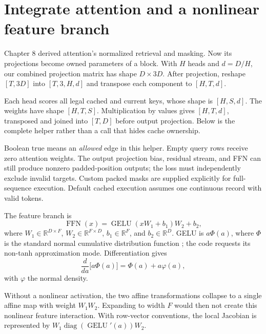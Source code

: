 
\section{Integrate attention and a nonlinear feature branch}
Chapter 8 derived attention's normalized retrieval and masking. Now its projections become owned parameters of a block. With $H$ heads and $d=D/H$, our combined projection matrix has shape $D\times3D$. After projection, reshape $[T,3D]$ into $[T,3,H,d]$ and transpose each component to $[H,T,d]$.

Each head scores all legal cached and current keys, whose shape is $[H,S,d]$. The weights have shape $[H,T,S]$. Multiplication by values gives $[H,T,d]$, transposed and joined into $[T,D]$ before output projection. Below is the complete helper rather than a call that hides cache ownership.

Boolean true means an \emph{allowed} edge in this helper. Empty query rows receive zero attention weights. The output projection bias, residual stream, and FFN can still produce nonzero padded-position outputs; the loss must independently exclude invalid targets. Custom packed masks are supplied explicitly for full-sequence execution. Default cached execution assumes one continuous record with valid tokens.

The feature branch is
\begin{equation}
\operatorname{FFN}(x)=\operatorname{GELU}(xW_1+b_1)W_2+b_2,
\end{equation}
where $W_1\in\mathbb R^{D\times F}$, $W_2\in\mathbb R^{F\times D}$,
$b_1\in\mathbb R^F$, and $b_2\in\mathbb R^D$. GELU is $a\Phi(a)$, where $\Phi$ is the standard normal cumulative distribution function \cite{gelu}; the code requests its non-tanh approximation mode. Differentiation gives
\begin{equation}
\frac{d}{da}\bigl[a\Phi(a)\bigr]=\Phi(a)+a\varphi(a),
\end{equation}
with $\varphi$ the normal density.

Without a nonlinear activation, the two affine transformations collapse to a single affine map with weight $W_1W_2$. Expanding to width $F$ would then not create this nonlinear feature interaction. With row-vector conventions, the local Jacobian is represented by
$W_1\operatorname{diag}(\operatorname{GELU}'(a))W_2$.

